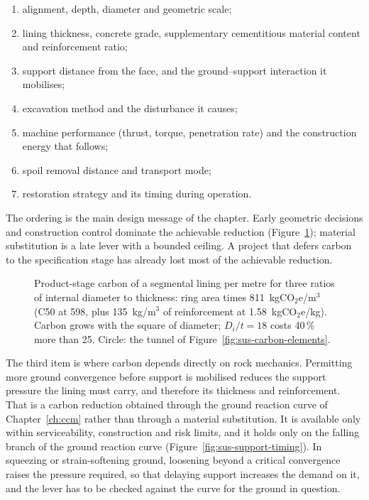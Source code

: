 \begin{enumerate}
 \item alignment, depth, diameter and geometric scale;
 \item lining thickness, concrete grade, supplementary cementitious material
 content and reinforcement ratio;
 \item support distance from the face, and the ground--support interaction it
 mobilises;
 \item excavation method and the disturbance it causes;
 \item machine performance (thrust, torque, penetration rate) and the
 construction energy that follows;
 \item spoil removal distance and transport mode;
 \item restoration strategy and its timing during operation.
\end{enumerate}

The ordering is the main design message of the chapter. Early geometric
decisions and construction control dominate the achievable reduction
(Figure~\ref{fig:sus-lining-carbon}); material
substitution is a late lever with a bounded ceiling. A project that defers
carbon to the specification stage has already lost most of the achievable
reduction.

\begin{figure}[htbp]
\centering
{}
\caption{Product-stage carbon of a segmental lining per metre for three ratios
of internal diameter to thickness: ring area times 811~kgCO$_2$e/m$^3$ (C50 at
598, plus 135~kg/m$^3$ of reinforcement at 1.58~kgCO$_2$e/kg). Carbon grows
with the square of diameter; $D_i/t = 18$ costs 40\,\% more than 25. Circle:
the tunnel of Figure~\ref{fig:sus-carbon-elements}.}
\label{fig:sus-lining-carbon}
\end{figure}

The third item is where
carbon depends directly on rock mechanics. Permitting more ground convergence before support
is mobilised reduces the support pressure the lining must carry, and therefore
its thickness and reinforcement. That is a carbon reduction obtained through
the ground reaction curve of Chapter~\ref{ch:ccm} rather than through a
material substitution. It is available only within serviceability, construction
and risk limits, and it holds only on the falling branch of
the ground reaction curve (Figure~\ref{fig:sus-support-timing}). In squeezing or strain-softening ground, loosening
beyond a critical convergence raises the pressure required, so that delaying
support increases the demand on it, and the lever has to be checked against
the curve for the ground in question.

